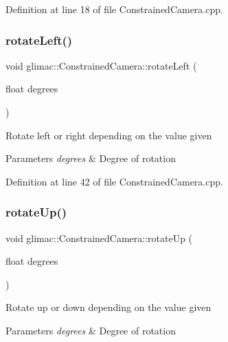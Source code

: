 Definition at line 18 of file Constrained\+Camera.\+cpp.

\mbox{\label{classglimac_1_1_constrained_camera_a7dec7758e2a9c7b97c95f332410ae606}} 
\subsubsection{\texorpdfstring{rotate\+Left()}{rotateLeft()}}
{\footnotesize\ttfamily void glimac\+::\+Constrained\+Camera\+::rotate\+Left (\begin{DoxyParamCaption}\item[{float}]{degrees }\end{DoxyParamCaption})}

Rotate left or right depending on the value given 
\begin{DoxyParams}{Parameters}
{\em degrees} & Degree of rotation \\
\hline
\end{DoxyParams}


Definition at line 42 of file Constrained\+Camera.\+cpp.

\mbox{\label{classglimac_1_1_constrained_camera_ae6ebbd25294f956ed2f513710cecc576}} 
\subsubsection{\texorpdfstring{rotate\+Up()}{rotateUp()}}
{\footnotesize\ttfamily void glimac\+::\+Constrained\+Camera\+::rotate\+Up (\begin{DoxyParamCaption}\item[{float}]{degrees }\end{DoxyParamCaption})}

Rotate up or down depending on the value given 
\begin{DoxyParams}{Parameters}
{\em degrees} & Degree of rotation \\
\hline
\end{DoxyParams}


